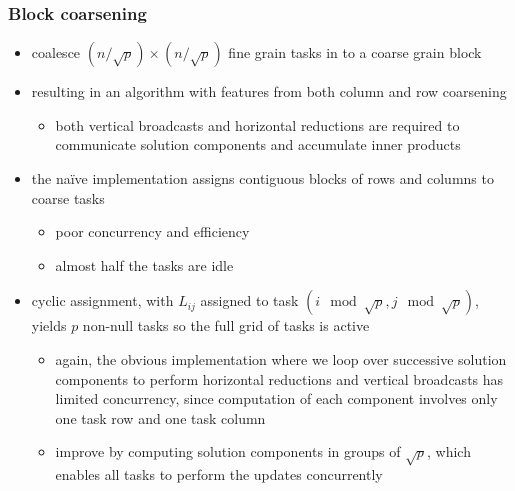 \begin{frame}[fragile]
%
  \frametitle{Block coarsening}
%
  \begin{itemize}
%
  \item coalesce $(n/\sqrt{p}) \times (n/\sqrt{p})$ fine grain tasks in to a coarse grain block
%
  \item resulting in an algorithm with features from both column and row coarsening
    \begin{itemize}
    \item both vertical broadcasts and horizontal reductions are required to communicate
      solution components and accumulate inner products
    \end{itemize}
%
  \item the na\"ive implementation assigns contiguous blocks of rows and columns to coarse
    tasks
    \begin{itemize}
    \item poor concurrency and efficiency 
    \item almost half the tasks are idle
    \end{itemize}
%
  \item cyclic assignment, with $L_{ij}$ assigned to task $(i \mod \sqrt{p}, j \mod \sqrt{p})$,
    yields $p$ non-null tasks so the full grid of tasks is active
    \begin{itemize}
    \item again, the obvious implementation where we loop over successive solution components
      to perform horizontal reductions and vertical broadcasts has limited concurrency, since
      computation of each component involves only one task row and one task column
    \item improve by computing solution components in groups of $\sqrt{p}$, which enables all
      tasks to perform the updates concurrently
    \end{itemize}
%
  \end{itemize}
%
\end{frame}

